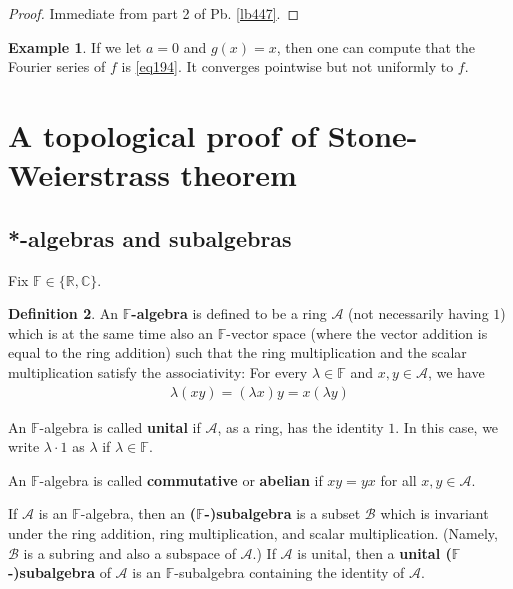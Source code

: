 \documentclass[12pt,b5paper,notitlepage]{article}
\theoremstyle{definition}
\newtheorem{df}{Definition}[section]
\newtheorem{eg}[df]{Example}
\theoremstyle{plain}
\newcommand{\scr}{\mathscr}
\newcommand{\Cbb}{\mathbb C}
\newcommand{\Rbb}{\mathbb R}
\newcommand{\Fbb}{\mathbb F}
\numberwithin{equation}{section}
\begin{document}
\begin{proof}
Immediate from part 2 of Pb. \ref{lb447}.
\end{proof}

\begin{eg}
If we let $a=0$ and $g(x)=x$, then one can compute that the Fourier series of $f$ is \eqref{eq194}. It converges pointwise but not uniformly to $f$.
\end{eg}



















\newpage



\section{A topological proof of Stone-Weierstrass theorem}



\subsection{*-algebras and subalgebras}

Fix $\Fbb\in\{\Rbb,\Cbb\}$.


\begin{df}
An \textbf{$\Fbb$-algebra}   is defined to be a ring $\scr A$ (not necessarily having $1$) which is at the same time also an $\Fbb$-vector space (where the vector addition is equal to the ring addition) such that the ring multiplication and the scalar multiplication satisfy the associativity: For every $\lambda\in\Fbb$ and $x,y\in\scr A$, we have
\begin{align}
\lambda(xy)=(\lambda x)y=x(\lambda y)
\end{align}

An $\Fbb$-algebra is called \textbf{unital}  if $\scr A$, as a ring, has the identity $1$. In this case, we write $\lambda\cdot 1$ as $\lambda$ if $\lambda\in\Fbb$. 

An $\Fbb$-algebra is called \textbf{commutative} or \textbf{abelian}   if $xy=yx$ for all $x,y\in\scr A$.

If $\scr A$ is an $\Fbb$-algebra, then an \textbf{($\Fbb$-)subalgebra}  is a subset $\scr B$ which is invariant under the ring addition, ring multiplication, and scalar multiplication. (Namely, $\scr B$ is a subring and also a subspace of $\scr A$.) If $\scr A$ is unital, then a \textbf{unital ($\Fbb$-)subalgebra} of $\scr A$ is an $\Fbb$-subalgebra containing the identity of $\scr A$.  \hfill\qedsymbol
\end{df}
\end{document}
